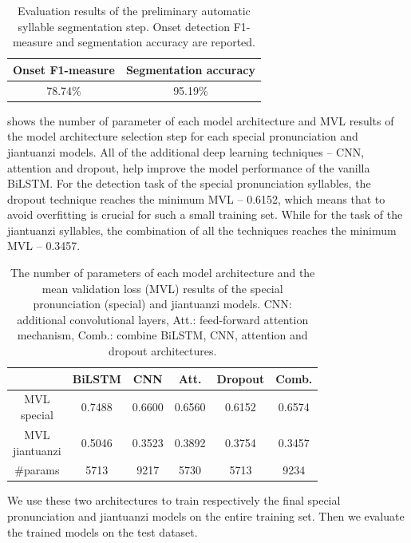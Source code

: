 \begin{table}[ht!]
\centering
\caption{Evaluation results of the preliminary automatic syllable segmentation step. Onset detection F1-measure and segmentation accuracy are reported.}
\label{tab:ch6:syllable_segmentation_results}
\begin{tabular}{cc}
\toprule
Onset F1-measure & Segmentation accuracy \\
\midrule
78.74\% & 95.19\% \\
\bottomrule
\end{tabular}
\end{table}

 shows the number of parameter of each model architecture and MVL results of the model architecture selection step for each special pronunciation and jiantuanzi models. All of the additional deep learning techniques -- CNN, attention and dropout, help improve the model performance of the vanilla BiLSTM. For the detection task of the special pronunciation syllables, the dropout technique reaches the minimum MVL -- 0.6152, which means that to avoid overfitting is crucial for such a small training set. While for the task of the jiantuanzi syllables, the combination of all the techniques reaches the minimum MVL -- 0.3457.  

\begin{table}[ht!]
\centering
\caption{The number of parameters of each model architecture and the mean validation loss (MVL) results of the special pronunciation (special) and jiantuanzi models. CNN: additional convolutional layers, Att.: feed-forward attention mechanism, Comb.: combine BiLSTM, CNN, attention and dropout architectures.}
\label{tab:ch6:results_discriminative_val}
\begin{tabular}{cccccc}
\toprule
& BiLSTM & CNN & Att. & Dropout & Comb. \\
\midrule
\makecell{MVL\\special} & 0.7488 & 0.6600 & 0.6560 & 0.6152 & 0.6574 \\
\makecell{MVL\\jiantuanzi} & 0.5046 & 0.3523 & 0.3892 & 0.3754 & 0.3457 \\
\#params & 5713 & 9217 & 5730 & 5713 & 9234 \\
\bottomrule
\end{tabular}
\end{table}

We use these two architectures to train respectively the final special pronunciation and jiantuanzi models on the entire training set. Then we evaluate the trained models on the test dataset.

